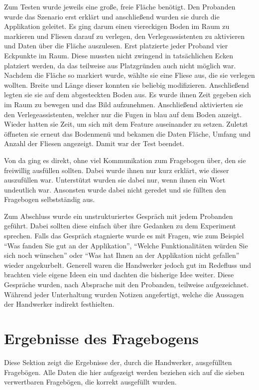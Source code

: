 Zum Testen wurde jeweils eine große, freie Fläche benötigt. Den Probanden wurde das Szenario erst erklärt und anschließend wurden sie durch die Applikation geleitet. Es ging darum einen viereckigen Boden im Raum zu markieren und Fliesen darauf zu verlegen, den Verlegeassistenten zu aktivieren und Daten über die Fläche auszulesen. Erst platzierte jeder Proband vier Eckpunkte im Raum. Diese mussten nicht zwingend in tatsächlichen Ecken platziert werden, da das teilweise aus Platzgründen auch nicht möglich war. Nachdem die Fläche so markiert wurde, wählte sie eine Fliese aus, die sie verlegen wollten. Breite und Länge dieser konnten sie beliebig modifizieren. Anschließend legten sie sie auf dem abgesteckten Boden aus. Es wurde ihnen Zeit gegeben sich im Raum zu bewegen und das Bild aufzunehmen. Anschließend aktivierten sie den Verlegeassistenten, welcher nur die Fugen in blau auf dem Boden anzeigt. Wieder hatten sie Zeit, um sich mit dem Feature auseinander zu setzen. Zuletzt öffneten sie erneut das Bodenmenü und bekamen die Daten Fläche, Umfang und Anzahl der Fliesen angezeigt. Damit war der Test beendet.

Von da ging es direkt, ohne viel Kommunikation zum Fragebogen über, den sie freiwillig ausfüllen sollten. Dabei wurde ihnen nur kurz erklärt, wie dieser auszufüllen war. Unterstützt wurden sie dabei nur, wenn ihnen ein Wort undeutlich war. Ansonsten wurde dabei nicht geredet und sie füllten den Fragebogen selbstständig aus.

Zum Abschluss wurde ein unstrukturiertes Gespräch mit jedem Probanden geführt. Dabei sollten diese einfach über ihre Gedanken zu dem Experiment sprechen. Falls das Gespräch stagnierte wurde es mit Fragen, wie zum Beispiel \enquote{Was fanden Sie gut an der Applikation}, \enquote{Welche Funktionalitäten würden Sie sich noch wünschen} oder \enquote{Was hat Ihnen an der Applikation nicht gefallen} wieder angekurbelt. Generell waren die Handwerker jedoch gut im Redefluss und brachten viele eigene Ideen ein und dachten die bisherige Idee weiter. Diese Gespräche wurden, nach Absprache mit den Probanden, teilweise aufgezeichnet. Während jeder Unterhaltung wurden Notizen angefertigt, welche die Aussagen der Handwerker indirekt festhielten.

\section{Ergebnisse des Fragebogens}

Diese Sektion zeigt die Ergebnisse der, durch die Handwerker, ausgefüllten Fragebögen. Alle Daten die hier aufgezeigt werden beziehen sich auf die sieben verwertbaren Fragebögen, die korrekt ausgefüllt wurden. 

